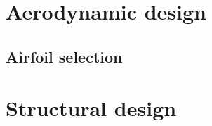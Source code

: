 \documentclass[11pt, a4paper, twoside]{book}
\begin{document}




\newpage


\tableofcontents
\listoffigures
\listoftables
\newpage




\chapter{Aerodynamic design}

\section{Airfoil selection}



\chapter{Structural design}
\end{document}

